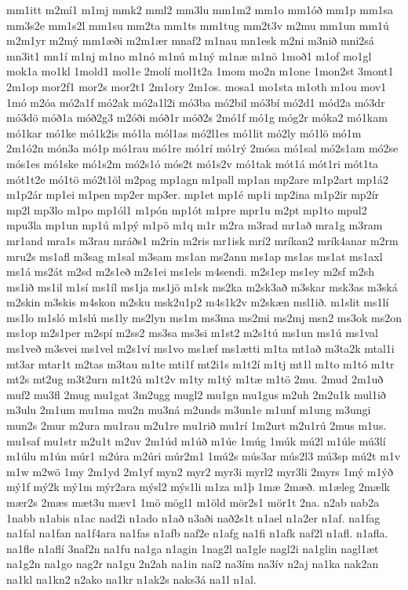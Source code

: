 {mm1itt
m2mí1
m1mj
mmk2
mml2
mm3lu
mm1m2
mm1o
mm1óð
mm1p
mm1sa
mm3s2e
mm1s2l
mm1su
mm2ta
mm1ts
mm1tug
mm2t3v
m2mu
mm1un
mm1ú
m2m1yr
m2mý
mm1æði
m2m1ær
mnaf2
m1nau
mn1esk
m2ni
m3nið
mni2sá
mn3it1
mn1í
m1nj
m1no
m1nó
m1nú
m1ný
m1næ
m1nö
1moð1
m1of
mo1gl
mok1a
mo1kl
1mold1
mol1e
2molí
mol1t2a
1mom
mo2n
m1one
1mon2st
3mont1
2m1op
mor2f1
mor2s
mor2t1
2m1ory
2m1os.
mosa1
mo1sta
m1oth
m1ou
mov1
1mó
m2óa
mó2a1f
mó2ak
mó2a1l2i
mó3ba
mó2bil
mó3bí
mó2d1
mód2a
mó3dr
mó3dö
móð1a
móð2g3
m2óði
móð1r
móð2s
2mó1f
mó1g
móg2r
móka2
mó1kam
mó1kar
mó1ke
mó1k2is
mó1la
mól1as
mó2l1es
mó1lit
mó2ly
mó1lö
mó1m
2m1ó2n
món3a
mó1p
mó1rau
mó1re
mó1rí
mó1rý
2mósa
mó1sal
mó2s1am
mó2se
mós1es
mó1ske
mó1s2m
mó2s1ó
mós2t
mó1s2v
mó1tak
mót1á
mót1ri
mót1ta
mót1t2e
mó1tö
mó2t1öl
m2pag
mp1agn
m1pall
mp1an
mp2are
m1p2art
mp1á2
m1p2ár
mp1ei
m1pen
mp2er
mp3er.
mp1et
mp1é
mp1i
mp2ina
m1p2ir
mp2ír
mp2l
mp3lo
m1po
mp1ól1
m1pón
mp1ót
m1pre
mpr1u
m2pt
mp1to
mpul2
mpu3la
mp1un
mp1ú
m1pý
m1pö
m1q
m1r
m2ra
m3rad
mr1að
mra1g
m3ram
mr1and
mra1s
m3rau
mráðs1
m2rin
m2ris
mr1isk
mrí2
mríkan2
mrík4anar
m2rm
mru2s
ms1afl
m3sag
m1sal
m3sam
ms1an
ms2ann
ms1ap
ms1as
ms1at
ms1axl
ms1á
ms2át
m2sd
m2s1eð
m2s1ei
ms1els
m4sendi.
m2s1ep
ms1ey
m2sf
m2sh
ms1ið
ms1il
m1sí
ms1íl
ms1ja
ms1jö
m1sk
ms2ka
m2sk3að
m3skar
msk3as
m3ská
m2skin
m3skis
m4skon
m2sku
msk2u1p2
m4s1k2v
m2skæn
msl1ið.
m1slit
ms1lí
ms1lo
m1sló
m1slú
ms1ly
ms2lyn
ms1m
ms3ma
ms2mi
ms2mj
msn2
ms3ok
ms2on
ms1op
m2s1per
m2spí
m2ss2
ms3sa
ms3si
m1st2
m2s1tú
ms1un
ms1ú
ms1val
ms1veð
m3svei
ms1vel
m2s1ví
ms1vo
ms1æf
ms1ætti
m1ta
mt1að
m3ta2k
mtal1i
mt3ar
mtar1t
m2tas
m3tau
m1te
mti1f
mt2i1s
m1t2í
m1tj
mt1l
m1to
m1tó
m1tr
mt2s
mt2ug
m3t2urn
m1t2ú
m1t2v
m1ty
m1tý
m1tæ
m1tö
2mu.
2mud
2m1uð
muf2
mu3fl
2mug
mu1gat
3m2ugg
mugl2
mu1gn
mu1gus
m2uh
2m2u1k
mul1ið
m3ulu
2m1um
mu1ma
mu2n
mu3ná
m2unds
m3un1e
m1unf
m1ung
m3ungi
mun2s
2mur
m2ura
mu1rau
m2u1re
mu1rið
mu1rí
1m2urt
m2u1rú
2mus
m1us.
mu1saf
mu1str
m2u1t
m2uv
2m1úd
m1úð
m1úe
1múg
1múk
mú2l
m1úle
mú3lí
m1úlu
m1ún
múr1
m2úra
m2úri
múr2m1
1mú2s
mús3ar
mús2l3
mú3sp
mú2t
m1v
m1w
m2wö
1my
2m1yd
2m1yf
myn2
myr2
myr3i
myrl2
myr3li
2myrs
1mý
m1ýð
mý1f
mý2k
mý1m
mýr2ara
mýsl2
mýs1li
m1za
m1þ
1mæ
2mæð.
m1æleg
2mælk
mær2s
2mæs
mæt3u
mæv1
1mö
mögl1
m1öld
mör2s1
mör1t
2na.
n2ab
nab2a
1nabb
n1abis
n1ac
nad2i
n1ado
n1að
n3aði
nað2s1t
n1ael
n1a2er
n1af.
na1fag
na1fal
na1fan
na1f4ara
na1fas
n1afb
naf2e
n1afg
na1fi
n1afk
naf2l
n1afl.
n1afla.
na1fle
n1aflí
3naf2n
na1fu
na1ga
n1agin
1nag2l
na1gle
nagl2i
na1glin
nagl1æt
na1g2n
na1go
nag2r
na1gu
2n2ah
na1in
naí2
na3ím
na3ív
n2aj
na1ka
nak2an
na1kl
na1kn2
n2ako
na1kr
n1ak2s
naks3á
na1l
n1al.
}
